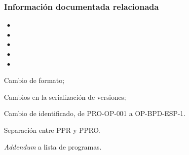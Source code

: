 \subsubsection{Información documentada relacionada}
\begin{itemize}
	\item \REvCA
	\item \REvDQ
	\item \RRCA
	\item \RTAC
	\item \BitBPH
\end{itemize}

\begin{changelog}[simple, sectioncmd=\subsection*,label=changelog-1.2]
	\begin{version}[v=2.1, date=2023--01, author=Pablo E. Alanis]
			\item Cambio de formato;
			\item Cambios en la serialización de versiones;
			\item Cambio de identificado, de PRO-OP-001 a OP-BPD-ESP-1.
			\item Separación entre \gls{PPR} y \gls{PPRO}.
	\end{version}

	\begin{version}[v=1.9, date=2022--05, author=Alonso M.]
		\item \textit{Addendum} a lista de programas.
	\end{version}
\end{changelog}